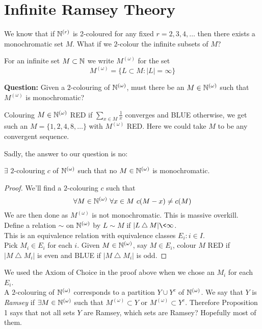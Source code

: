 \documentclass[a4paper]{article}
\newcommand{\Nomega}{\N^{(\omega)}}
\newcommand{\Momega}{M^{(\omega)}}
\begin{document}
  \section{Infinite Ramsey Theory}
  We know that if $\mathbb{N}^{(r)}$ is 2-coloured for any fixed $r = 2, 3, 4, \dots$
  then there exists a monochromatic set $M$. What if we $2$-colour the
  infinite subsets of $M$?
  \begin{defi}[$\Momega$]\index{$\Momega$}
    For an infinite set $M \subset \mathbb{N}$ we write $\Momega$ for the set
    \[ \Momega = \{L \subset M :|L| = \infty\}\]
  \end{defi}
  \textbf{Question:} Given a $2$-colouring of $\Nomega$, must
  there be an $M \in \Nomega$ such that $\Momega$ is monochromatic?
  \begin{eg}
    Colouring $M \in \Nomega$ RED if $\sum_{x \in M}\frac{1}{x}$ converges and
    BLUE otherwise, we get such an $M = \{1,2,4,8,\dots\}$ with $\Momega$ RED.
    Here we could take $M$ to be any convergent sequence.
  \end{eg}Sadly, the answer to our question is no:
  \begin{prop}
    $\exists$ $2$-colouring $c$ of $\Nomega$ such that no $M \in \Nomega$ is monochromatic.
  \end{prop}
  \begin{proof}
    We'll find a $2$-colouring $c$ such that
    \[\forall M \in \Nomega \ \forall x \in M \ c(M-x) \neq c(M)\]
    We are then done as $\Momega$ is not monochromatic. This is massive
    overkill.\\
    Define a relation $\sim$ on $\Nomega$ by $L \sim M$ if $|L \bigtriangleup M| \<
    \infty$.\\
    This is an equivalence relation with equivalence classes $E_i : i \in I$.\\
    Pick $M_i \in E_i$ for each $i$. Given $M \in \Nomega$, say $M \in E_i$,
    colour $M$ RED if $|M \bigtriangleup M_i|$ is even and BLUE if $|M
    \bigtriangleup M_i|$ is odd.
  \end{proof}
  We used the Axiom of Choice in the proof above when we chose an $M_i$ for each
  $E_i$.\\
  A $2$-colouring of $\Nomega$ corresponds to a partition $Y \cup Y^c$ of
  $\Nomega$. We say that $Y$ is \textit{Ramsey} if $\exists M \in \Nomega$ such
  that $\Momega \subset Y$ or $\Momega \subset Y^c$. Therefore Proposition 1
  says that not all sets $Y$ are Ramsey, which sets are Ramsey? Hopefully most
  of them.\\
\end{document}
